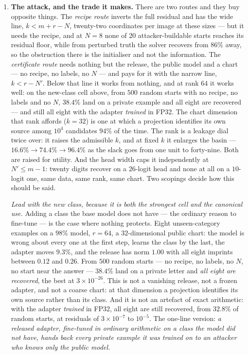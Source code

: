 \begin{enumerate}
\item \textbf{The attack, and the trade it makes.} There are two routes and
  they buy opposite things. The \emph{recipe route} inverts the full residual
  and has the wide line, $k<m+r-N$, twenty-two coordinates per image at these
  sizes --- but it needs the recipe, and at $N=8$ none of $20$
  attacker-buildable starts reaches its residual floor, while from perturbed
  truth the solver recovers from $86\%$ away, so the obstruction there is the
  initialiser and not the information. The \emph{certificate route} needs
  nothing but the release, the public model and a chart --- no recipe, no
  labels, no $N$ --- and pays for it with the narrow line, $k<r-N'$. Below
  that line it works from nothing, and at rank $64$ it works well: on the
  new-class cell above, from $500$ random starts with no recipe, no labels and
  no $N$, $38.4\%$ land on a private example and all eight are recovered ---
  and still all eight with the adapter \emph{trained} in FP32. The chart
  dimension that rank affords ($k=32$) is one at which a projection identifies
  its own source among $10^4$ candidates $94\%$ of the time. The rank is a leakage
  dial twice over: it raises the admissible $k$, and at fixed $k$ it enlarges
  the basin --- $16.6\%\to74.4\%\to96.4\%$ as the slack goes from one unit to
  forty-nine. Both are raised for utility. And the head width caps it
  independently at $N'\le m-1$: twenty digits recover on a $26$-logit head and
  none at all on a $10$-logit one, same data, same rank, same chart. Two scopings decide how this should be said.

  \emph{Lead with the new class, because it is both the strongest cell and
  the canonical use.} Adding a class the base model does not have --- the
  ordinary reason to fine-tune --- is the case where nothing protects. Eight
  unseen-category examples on a $98\%$ model, $r=64$, a $32$-dimensional
  public chart: the model is wrong about every one at the first step, learns
  the class by the last, the adapter moves $9.3\%$, and the release has norm
  $1.00$ with all eight imprints between $0.12$ and $0.26$. From $500$ random
  starts --- no recipe, no labels, no $N$, no start near the answer ---
  $38.4\%$ land on a private letter and \emph{all eight are recovered}, the
  best at $3\times10^{-26}$. This is not a vanishing release, not a frozen
  adapter, and not a coarse chart: at that dimension a projection identifies
  its own source rather than its class. And it is not an artefact of exact
  arithmetic: with the adapter \emph{trained} in FP32, all eight are still
  recovered, from $32.8\%$ of random starts, at residuals of $3\times10^{-7}$
  to $10^{-5}$. The one-line version: \emph{a released adapter, fine-tuned in
  ordinary arithmetic on a class the model did not have, hands back every
  private example it was trained on to an attacker who knows only the public
  model.}


\end{enumerate}
